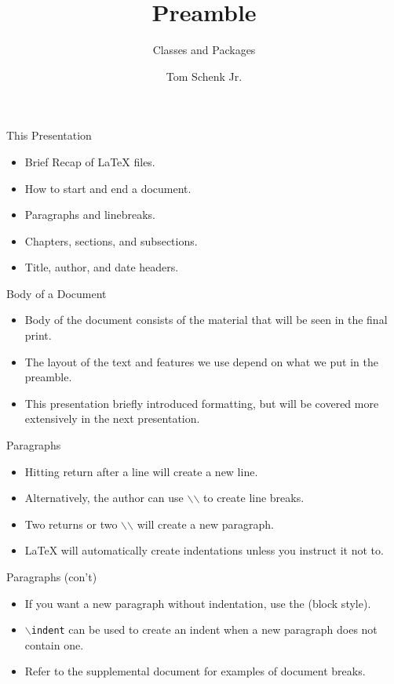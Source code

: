 \documentclass[pdf]{prosper}
\title{Preamble}
\subtitle{Classes and Packages}
\author{Tom Schenk Jr.}
\begin{document}
\maketitle
\begin{slide}{This Presentation}
	\begin{itemize}
		\item Brief Recap of \LaTeX\mbox{} files.
		\item How to start and end a document.
		\item Paragraphs and linebreaks.
		\item Chapters, sections, and subsections.
		\item Title, author, and date headers.
	\end{itemize}
\end{slide}
\begin{slide}{Body of a Document}
	\begin{itemize}
		\item Body of the document consists of the material that will be seen in the final print.
		\item The layout of the text and features we use depend on what we put in the preamble.
		\item This presentation briefly introduced formatting, but will be covered more extensively in the next presentation.
	\end{itemize}
\end{slide}
\begin{slide}{Paragraphs}
	\begin{itemize}
		\item Hitting return after a line will create a new line.
		\item Alternatively, the author can use \texttt{$\backslash$$\backslash$} to create line breaks.
		\item Two returns or two \texttt{$\backslash$$\backslash$} will create a new paragraph.
		\item \LaTeX\mbox{} will automatically create indentations unless you instruct it not to.
	\end{itemize}
\end{slide}
\begin{slide}{Paragraphs (con't)}
	\begin{itemize}
		\item If you want a new paragraph without indentation, use the  (block style).
		\item \texttt{$\backslash$indent} can be used to create an indent when a new paragraph does not contain one.
		\item Refer to the supplemental document for examples of document breaks.
	\end{itemize}
\end{slide}
\end{document}

